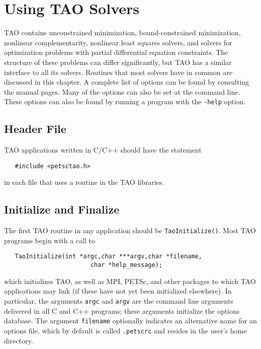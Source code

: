 %
%

\chapter{Using TAO Solvers}
\label{chapter:tao_solver}

TAO contains unconstrained minimization, bound-constrained minimization, 
nonlinear complementarity, nonlinear least squares solvers, and solvers
for optimization problems with partial differential equation constraints.
The structure of these problems can differ significantly, but TAO has a 
similar interface to all its solvers.  
Routines that most solvers have in common are discussed in 
this chapter.
A complete list of options can be found by consulting the manual pages.
Many of the options can also be set at the command line.  These options
can also be found by
running a program with the {\tt -help} option.

\section{Header File}

TAO applications written in C/C++ should have the statement 
\begin{verbatim}
   #include <petsctao.h>
\end{verbatim}
\noindent
in each file that uses a routine in the TAO libraries.


\section{Initialize and Finalize}

The first TAO routine in any application should be {\tt TaoInitialize()}.
Most TAO programs begin with a call to
\begin{verbatim}
   TaoInitialize(int *argc,char ***argv,char *filename, 
                        char *help_message);
\end{verbatim}
which initializes TAO, as well as MPI, PETSc, and other packages
to which TAO applications may link (if these have not yet
been initialized elsewhere).  
In particular, the arguments {\tt argc} and 
{\tt argv} are the command line arguments delivered in all C and C++
programs; these arguments initialize the options database.  
 The argument {\tt filename}
optionally indicates an alternative name for an options file, which by
default is called {\tt .petscrc} and resides in the user's home directory.

